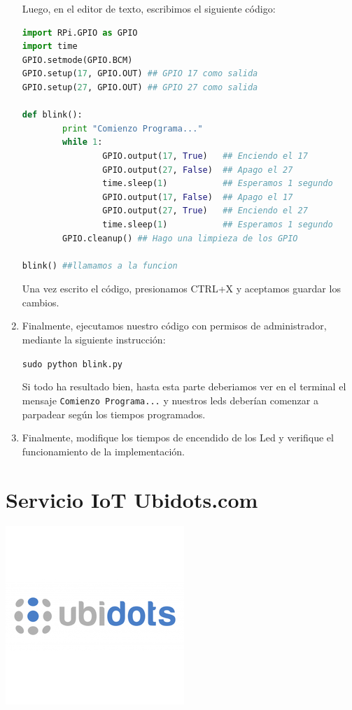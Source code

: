 \documentclass[letterpaper, 10pt]{report}
\begin{document}
\begin{enumerate}
	Luego, en el editor de texto, escribimos el siguiente código:
	
	\begin{lstlisting}[language=Python, style=myArduino]
import RPi.GPIO as GPIO
import time
GPIO.setmode(GPIO.BCM)
GPIO.setup(17, GPIO.OUT) ## GPIO 17 como salida
GPIO.setup(27, GPIO.OUT) ## GPIO 27 como salida

def blink():
        print "Comienzo Programa..."
        while 1:
                GPIO.output(17, True) 	## Enciendo el 17
                GPIO.output(27, False) 	## Apago el 27
                time.sleep(1) 			## Esperamos 1 segundo
                GPIO.output(17, False) 	## Apago el 17
                GPIO.output(27, True) 	## Enciendo el 27
                time.sleep(1) 			## Esperamos 1 segundo
        GPIO.cleanup() ## Hago una limpieza de los GPIO	
        
blink()	##llamamos a la funcion
\end{lstlisting}	

Una vez escrito el código, presionamos CTRL+X y aceptamos guardar los cambios.

\item Finalmente, ejecutamos nuestro código con permisos de administrador, mediante la siguiente instrucción:
\begin{center}
	\texttt{sudo python blink.py}
\end{center}

Si todo ha resultado bien, hasta esta parte deberiamos ver en el terminal el mensaje \texttt{Comienzo Programa...} y nuestros leds deberían comenzar a parpadear según los tiempos programados.

\item Finalmente, modifique los tiempos de encendido de los Led y verifique el funcionamiento de la implementación.
\end{enumerate}

\newpage
\section{Servicio IoT Ubidots.com}

\begin{center}
\includegraphics[scale=0.3]{ubidots.png}
\end{center}
\end{document}

